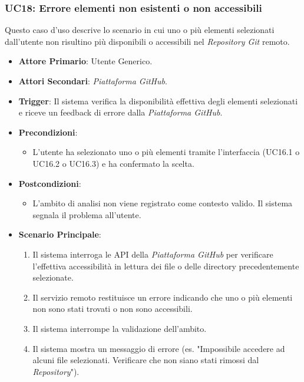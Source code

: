 \documentclass[12pt, a4paper]{article}
\begin{document}
\subsubsection{UC18: Errore elementi non esistenti o non accessibili}\label{uc:18}
Questo caso d'uso descrive lo scenario in cui uno o più elementi selezionati dall'utente non risultino più disponibili o accessibili nel \textit{Repository Git} remoto.
\begin{itemize}
    \item \textbf{Attore Primario}: Utente Generico.
    \item \textbf{Attori Secondari}: \textit{Piattaforma GitHub}.
    \item \textbf{Trigger}: Il sistema verifica la disponibilità effettiva degli elementi selezionati e riceve un feedback di errore dalla \textit{Piattaforma GitHub}.
    \item \textbf{Precondizioni}:\begin{itemize}\item L'utente ha selezionato uno o più elementi tramite l'interfaccia (UC16.1 o UC16.2 o UC16.3) e ha confermato la scelta.\end{itemize}
    \item \textbf{Postcondizioni}:\begin{itemize}\item L'ambito di analisi non viene registrato come contesto valido. Il sistema segnala il problema all'utente.\end{itemize}
    \item \textbf{Scenario Principale}:
    \begin{enumerate}
        \item Il sistema interroga le API della \textit{Piattaforma GitHub} per verificare l'effettiva accessibilità in lettura dei file o delle directory precedentemente selezionate.
        \item Il servizio remoto restituisce un errore indicando che uno o più elementi non sono stati trovati o non sono accessibili.
        \item Il sistema interrompe la validazione dell'ambito.
        \item Il sistema mostra un messaggio di errore (es. "Impossibile accedere ad alcuni file selezionati. Verificare che non siano stati rimossi dal \textit{Repository}").
    \end{enumerate}
\end{itemize}

\newpage
\end{document}
